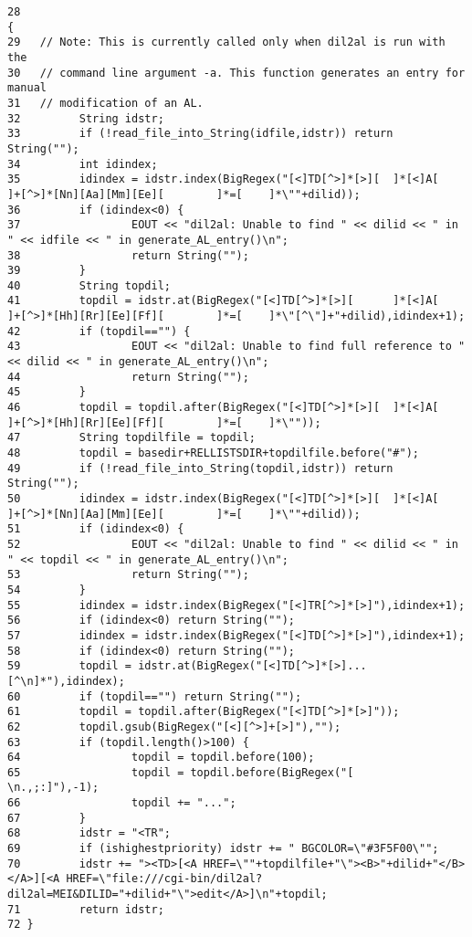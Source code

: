 \footnotesize\begin{verbatim}28                                                                        {
29   // Note: This is currently called only when dil2al is run with the
30   // command line argument -a. This function generates an entry for manual
31   // modification of an AL.
32         String idstr;
33         if (!read_file_into_String(idfile,idstr)) return String("");
34         int idindex;
35         idindex = idstr.index(BigRegex("[<]TD[^>]*[>][  ]*[<]A[         ]+[^>]*[Nn][Aa][Mm][Ee][        ]*=[    ]*\""+dilid));
36         if (idindex<0) {
37                 EOUT << "dil2al: Unable to find " << dilid << " in " << idfile << " in generate_AL_entry()\n";
38                 return String("");
39         }
40         String topdil;
41         topdil = idstr.at(BigRegex("[<]TD[^>]*[>][      ]*[<]A[         ]+[^>]*[Hh][Rr][Ee][Ff][        ]*=[    ]*\"[^\"]+"+dilid),idindex+1);
42         if (topdil=="") {
43                 EOUT << "dil2al: Unable to find full reference to " << dilid << " in generate_AL_entry()\n";
44                 return String("");
45         }
46         topdil = topdil.after(BigRegex("[<]TD[^>]*[>][  ]*[<]A[         ]+[^>]*[Hh][Rr][Ee][Ff][        ]*=[    ]*\""));
47         String topdilfile = topdil;
48         topdil = basedir+RELLISTSDIR+topdilfile.before("#");
49         if (!read_file_into_String(topdil,idstr)) return String("");
50         idindex = idstr.index(BigRegex("[<]TD[^>]*[>][  ]*[<]A[         ]+[^>]*[Nn][Aa][Mm][Ee][        ]*=[    ]*\""+dilid));
51         if (idindex<0) {
52                 EOUT << "dil2al: Unable to find " << dilid << " in " << topdil << " in generate_AL_entry()\n";
53                 return String("");
54         }
55         idindex = idstr.index(BigRegex("[<]TR[^>]*[>]"),idindex+1);
56         if (idindex<0) return String("");
57         idindex = idstr.index(BigRegex("[<]TD[^>]*[>]"),idindex+1);
58         if (idindex<0) return String("");
59         topdil = idstr.at(BigRegex("[<]TD[^>]*[>]...[^\n]*"),idindex);
60         if (topdil=="") return String("");
61         topdil = topdil.after(BigRegex("[<]TD[^>]*[>]"));
62         topdil.gsub(BigRegex("[<][^>]+[>]"),"");
63         if (topdil.length()>100) {
64                 topdil = topdil.before(100);
65                 topdil = topdil.before(BigRegex("[      \n.,;:]"),-1);
66                 topdil += "...";
67         }
68         idstr = "<TR";
69         if (ishighestpriority) idstr += " BGCOLOR=\"#3F5F00\"";
70         idstr += "><TD>[<A HREF=\""+topdilfile+"\"><B>"+dilid+"</B></A>][<A HREF=\"file:///cgi-bin/dil2al?dil2al=MEI&DILID="+dilid+"\">edit</A>]\n"+topdil;
71         return idstr;
72 }
\end{verbatim}\normalsize 
{}
